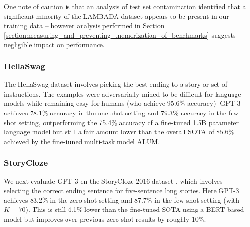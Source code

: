 \documentclass{article}
\begin{document}
One note of caution is that an analysis of test set contamination identified that a significant minority of the LAMBADA dataset appears to be present in our training data -- however analysis performed in Section \ref{section:measuring_and_preventing_memorization_of_benchmarks} suggests negligible impact on performance.
        
        \subsubsection{HellaSwag}
        \label{section:HellaSwag}
The HellaSwag dataset \cite{zellers2019hellaswag} involves picking the best ending to a story or set of instructions.  The examples were adversarially mined to be difficult for language models while remaining easy for humans (who achieve 95.6\% accuracy).  GPT-3 achieves 78.1\% accuracy in the one-shot setting and 79.3\% accuracy in the few-shot setting, outperforming the 75.4\% accuracy of a fine-tuned 1.5B parameter language model \cite{zellers2019defending} but still a fair amount lower than the overall SOTA of 85.6\% achieved by the fine-tuned multi-task model ALUM.

        \subsubsection{StoryCloze}
        \label{section:StoryCloze}
We next evaluate GPT-3 on the StoryCloze 2016 dataset \cite{mostafazadeh2016corpus}, which involves selecting the correct ending sentence for five-sentence long stories.  Here GPT-3 achieves 83.2\% in the zero-shot setting and 87.7\% in the few-shot setting (with $K=70$). This is still 4.1\% lower than the fine-tuned SOTA using a BERT based model \cite{li2019story} but improves over previous zero-shot results by roughly 10\%.
\end{document}

